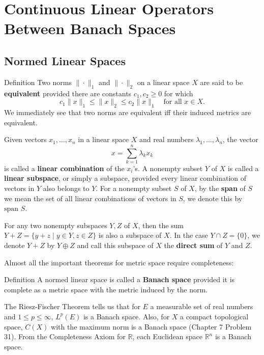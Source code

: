 \chapter{Continuous Linear Operators Between Banach Spaces}

\section{Normed Linear Spaces}

\begin{namedthm*}{Definition}
    Two norms $\|\cdot\|_1$ and $\|\cdot\|_2$ on a linear space $X$ are said to be \textbf{equivalent} provided there are constants $c_1,c_2\ge0$ for which
    \[
        c_1\|x\|_1\le\|x\|_2\le c_2\|x\|_1\quad\text{for all }x\in X.
    \]
    We immediately see that two norms are equivalent iff their induced metrics are equivalent.
\end{namedthm*}

Given vectors $x_1,\dots,x_n$ in a linear space $X$ and real numbers $\lambda_1,\dots,\lambda_n$, the vector
\[
    x=\sum_{k=1}^n\lambda_kx_k
\]
is called a \textbf{linear combination} of the $x_i$'s.
A nonempty subset $Y$ of $X$ is called a \textbf{linear subspace}, or simply a subspace, provided every linear combination of vectors in $Y$ also belongs to $Y$.
For a nonempty subset $S$ of $X$, by the \textbf{span} of $S$ we mean the set of all linear combinations of vectors in $S$, we denote this by $\text{span }S$.

For any two nonempty subspaces $Y,Z$ of $X$, then the sum $Y+Z=\{y+z\mid y\in Y,z\in Z\}$ is also a subspace of $X$.
In the case $Y\cap Z=\{0\}$, we denote $Y+Z$ by $Y\oplus Z$ and call this subspace of $X$ the \textbf{direct sum} of $Y$ and $Z$.

Almost all the important theorems for metric space require completeness:
\begin{namedthm*}{Definition}
    A normed linear space is called a \textbf{Banach space} provided it is complete as a metric space with the metric induced by the norm.
\end{namedthm*}
The Riesz-Fischer Theorem tells us that for $E$ a measurable set of real numbers and $1\le p\le\infty$, $L^p(E)$ is a Banach space.
Also, for $X$ a compact topological space, $C(X)$ with the maximum norm is a Banach space (Chapter 7 Problem 31).
From the Completeness Axiom for $\mathbb{R}$, each Euclidean space $\mathbb{R}^n$ is a Banach space.

